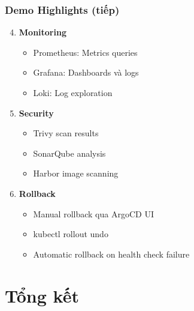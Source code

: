 \documentclass[aspectratio=169]{beamer}
\begin{document}
\begin{frame}
\frametitle{Demo Highlights (tiếp)}
\begin{enumerate}
    \setcounter{enumi}{3}
    \item \textbf{Monitoring}
    \begin{itemize}
        \item Prometheus: Metrics queries
        \item Grafana: Dashboards và logs
        \item Loki: Log exploration
    \end{itemize}
    
    \item \textbf{Security}
    \begin{itemize}
        \item Trivy scan results
        \item SonarQube analysis
        \item Harbor image scanning
    \end{itemize}
    
    \item \textbf{Rollback}
    \begin{itemize}
        \item Manual rollback qua ArgoCD UI
        \item kubectl rollout undo
        \item Automatic rollback on health check failure
    \end{itemize}
\end{enumerate}
\end{frame}

\section{Tổng kết}
\end{document}
